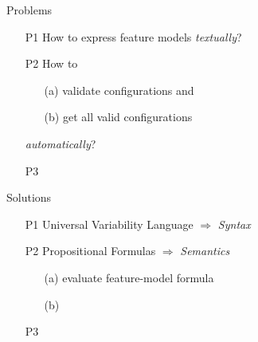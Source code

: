 \begin{frame}[label=FeatureModelTransformations]{\myframetitle}
\begin{mycolumns}[widths={52,48}]
	\mynextcolumn
		\begin{note}{Problems}
			\begin{enumerate}
				\item[P1] How to express feature models \emph{textually}?
				\item[P2] How to 
				\begin{itemize}
					\item[(a)] validate configurations and
					\item[(b)] get all valid configurations
				\end{itemize}
				\emph{automatically}?
				\item[P3] \color{gray}{(How to reverse engineer feature models?)}
			\end{enumerate}
		\end{note}
		\begin{note}{Solutions}
			\begin{enumerate}
				\item[P1] Universal Variability Language $\Rightarrow$ \emph{Syntax}
				\item[P2] Propositional Formulas $\Rightarrow$ \emph{Semantics}
				\begin{itemize}
					\item[(a)] evaluate feature-model formula
					\item[(b)] \lecturemodeling\partc{}
				\end{itemize}
				\item[P3] \color{gray}{(i) e.g., \bakarnaturallanguage\\(ii) e.g., \czarneckithereandbackagain}
			\end{enumerate}
		\end{note}
	\end{mycolumns}
\end{frame}


